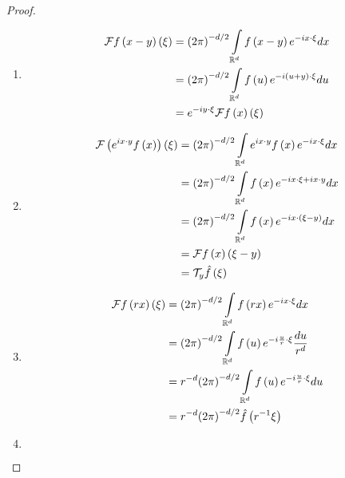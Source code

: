 \documentclass[letterpaper,twoside,12pt]{article}
\theoremstyle{mystyle}
\begin{document}
\begin{proof}
  \begin{enumerate}
    \item \begin{align*}
      \mathcal{F}f\left( {x - y} \right)\left( \xi  \right) &= {\left( {2\pi } \right)^{ - d/2}}\int\limits_{{\mathbb{R}^d}} {f\left( {x - y} \right){e^{ - ix \cdot \xi }}dx}  \hfill \\
       &= {\left( {2\pi } \right)^{ - d/2}}\int\limits_{{\mathbb{R}^d}} {f\left( u \right){e^{ - i\left( {u + y} \right) \cdot \xi }}du}  \hfill \\
       &= {e^{ - iy \cdot \xi }}\mathcal{F}f\left( x \right)\left( \xi  \right) 
    \end{align*}
    \item \begin{align*}
      \mathcal{F}\left( {{e^{ix \cdot y}}f\left( x \right)} \right)\left( \xi  \right) &= {\left( {2\pi } \right)^{ - d/2}}\int\limits_{{\mathbb{R}^d}} {{e^{ix \cdot y}}f\left( x \right){e^{ - ix \cdot \xi }}dx}  \hfill \\
       &= {\left( {2\pi } \right)^{ - d/2}}\int\limits_{{\mathbb{R}^d}} {f\left( x \right){e^{ - ix \cdot \xi  + ix \cdot y}}dx}  \hfill \\
       &= {\left( {2\pi } \right)^{ - d/2}}\int\limits_{{\mathbb{R}^d}} {f\left( x \right){e^{ - ix \cdot \left( {\xi  - y} \right)}}dx}  \hfill \\
       &= \mathcal{F}f\left( x \right)\left( {\xi  - y} \right) \hfill \\
       &= {\mathcal{T}_y}\hat f\left( \xi  \right)
    \end{align*}
    \item \begin{align*}
      \mathcal{F}f\left( {rx} \right)\left( \xi  \right) &= {\left( {2\pi } \right)^{ - d/2}}\int\limits_{{\mathbb{R}^d}} {f\left( {rx} \right){e^{ - ix \cdot \xi }}dx}  \hfill \\
       &= {\left( {2\pi } \right)^{ - d/2}}\int\limits_{{\mathbb{R}^d}} {f\left( u \right){e^{ - i\frac{u}{r} \cdot \xi }}\frac{{du}}{{{r^d}}}}  \hfill \\
       &= {r^{ - d}}{\left( {2\pi } \right)^{ - d/2}}\int\limits_{{\mathbb{R}^d}} {f\left( u \right){e^{ - i\frac{u}{r} \cdot \xi }}du}  \hfill \\
       &= {r^{ - d}}{\left( {2\pi } \right)^{ - d/2}}\hat f\left( {{r^{ - 1}}\xi } \right) 
    \end{align*}
    \item \begin{align*}

\end{align*}
\end{enumerate}
\end{proof}
\end{document}
